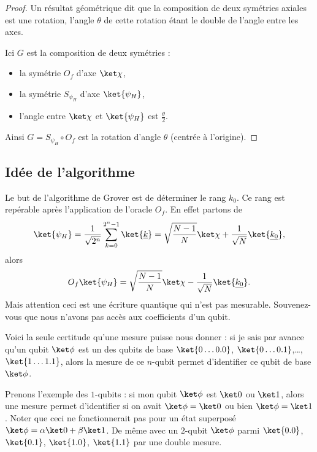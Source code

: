 \documentclass[11pt,class=report,crop=false]{standalone}
\begin{document}
 
\begin{proof}
Un résultat géométrique dit que la composition de deux symétries axiales est une rotation, l'angle $\theta$ de cette rotation étant le double de l'angle entre les axes.


Ici $G$ est la composition de deux symétries :
\begin{itemize}
  \item la symétrie $O_f$ d'axe $\ket\chi$, 
  \item la symétrie $S_{\psi_H}$ d'axe $\ket{\psi_H}$,
  \item l'angle entre $\ket\chi$ et $\ket{\psi_H}$ est $\frac\theta2$.
\end{itemize}
Ainsi $G = S_{\psi_H} \circ O_f$ est la rotation d'angle $\theta$ (centrée à l'origine).


\end{proof}

\subsection{Idée de l'algorithme}

Le but de l'algorithme de Grover est de déterminer le rang $k_0$. 
Ce rang est repérable après l'application de l'oracle $O_f$.
En effet partons de 
$$\ket{\psi_H} = \frac{1}{\sqrt{2^n}} \sum_{k=0}^{2^n-1} \ket{\underline{k}}
= \sqrt{\frac{N-1}{N}} \ket\chi + \frac{1}{\sqrt{N}} \ket{\underline{k_0}},$$
alors
$$O_f \ket{\psi_H} =  \sqrt{\frac{N-1}{N}} \ket\chi - \frac{1}{\sqrt{N}} \ket{\underline{k_0}}.$$
Mais attention ceci est une écriture quantique qui n'est pas mesurable.
Souvenez-vous que nous n'avons pas accès aux coefficients d'un qubit.

\bigskip

Voici la seule certitude qu'une mesure puisse nous donner : si je sais par avance qu'un qubit $\ket\phi$ est un des qubits de base $\ket{0\ldots0.0}$, $\ket{0\ldots0.1}$,\ldots, $\ket{1\ldots1.1}$, alors la mesure de ce $n$-qubit permet d'identifier ce qubit de base $\ket\phi$.

Prenons l'exemple des $1$-qubits : si mon qubit $\ket\phi$ est $\ket0$ ou $\ket1$, alors une mesure permet d'identifier si on avait $\ket\phi=\ket0$ ou bien $\ket\phi=\ket1$. Noter que ceci ne fonctionnerait pas pour un état superposé $\ket\phi=\alpha\ket0+\beta\ket1$. De même avec un $2$-qubit $\ket\phi$ parmi $\ket{0.0}$, $\ket{0.1}$, $\ket{1.0}$, $\ket{1.1}$ par une double mesure. 
\end{document}
